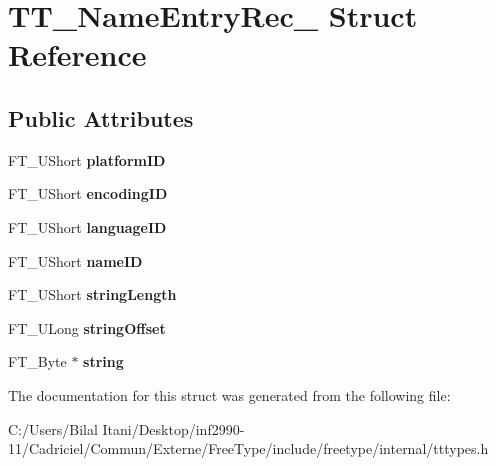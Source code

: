 \hypertarget{struct_t_t___name_entry_rec__}{}\section{T\+T\+\_\+\+Name\+Entry\+Rec\+\_\+ Struct Reference}
\label{struct_t_t___name_entry_rec__}
\subsection*{Public Attributes}
\begin{DoxyCompactItemize}
\item 
F\+T\+\_\+\+U\+Short {\bfseries platform\+ID}\hypertarget{struct_t_t___name_entry_rec___a9d4ee8bc42ed087f4533b6f664c0f6c6}{}\label{struct_t_t___name_entry_rec___a9d4ee8bc42ed087f4533b6f664c0f6c6}

\item 
F\+T\+\_\+\+U\+Short {\bfseries encoding\+ID}\hypertarget{struct_t_t___name_entry_rec___a8e7403a2f37c7f7fdb3c19e9549d315c}{}\label{struct_t_t___name_entry_rec___a8e7403a2f37c7f7fdb3c19e9549d315c}

\item 
F\+T\+\_\+\+U\+Short {\bfseries language\+ID}\hypertarget{struct_t_t___name_entry_rec___a2ec03c0ff0c542f403b45a515bb20afb}{}\label{struct_t_t___name_entry_rec___a2ec03c0ff0c542f403b45a515bb20afb}

\item 
F\+T\+\_\+\+U\+Short {\bfseries name\+ID}\hypertarget{struct_t_t___name_entry_rec___abdaaec01d6620b3801f233cde5964548}{}\label{struct_t_t___name_entry_rec___abdaaec01d6620b3801f233cde5964548}

\item 
F\+T\+\_\+\+U\+Short {\bfseries string\+Length}\hypertarget{struct_t_t___name_entry_rec___a736e5f8caeada86cc33f62acca6537f5}{}\label{struct_t_t___name_entry_rec___a736e5f8caeada86cc33f62acca6537f5}

\item 
F\+T\+\_\+\+U\+Long {\bfseries string\+Offset}\hypertarget{struct_t_t___name_entry_rec___a33ed41d4d3c4fffa74193f3b52e11870}{}\label{struct_t_t___name_entry_rec___a33ed41d4d3c4fffa74193f3b52e11870}

\item 
F\+T\+\_\+\+Byte $\ast$ {\bfseries string}\hypertarget{struct_t_t___name_entry_rec___aefa752d5c88149f8e64122e14855d831}{}\label{struct_t_t___name_entry_rec___aefa752d5c88149f8e64122e14855d831}

\end{DoxyCompactItemize}


The documentation for this struct was generated from the following file\+:\begin{DoxyCompactItemize}
\item 
C\+:/\+Users/\+Bilal Itani/\+Desktop/inf2990-\/11/\+Cadriciel/\+Commun/\+Externe/\+Free\+Type/include/freetype/internal/tttypes.\+h\end{DoxyCompactItemize}
